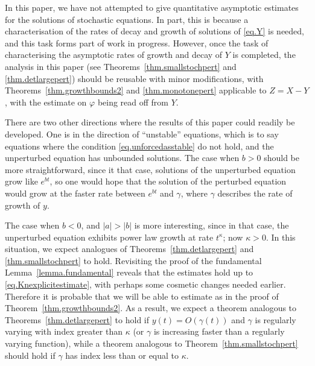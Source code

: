 \documentclass[a4paper,10pt,reqno]{amsart}
\numberwithin{equation}{section}
\theoremstyle{definition}
\theoremstyle{remark}
\DeclareMathOperator{\1}{\mathbbm 1}
\begin{document}
In this paper, we have not attempted to give quantitative asymptotic estimates for the solutions of stochastic equations. In part, this is because a characterisation of the rates of decay and growth of solutions of \eqref{eq.Y} is needed, and this task forms part of work in progress. However, once the task of characterising the asymptotic rates of growth and decay of $Y$ is completed, the analysis in this paper (see Theorems~\ref{thm.smallstochpert} and \ref{thm.detlargepert}) should be reusable with minor modifications, with Theorems~\ref{thm.growthbounds2} and \ref{thm.monotonepert} applicable to $Z=X-Y$, with the estimate on $\varphi$ being read off from $Y$.

There are two other directions where the results of this paper could readily be developed. One is in the direction of ``unstable'' equations, which is to say equations where the condition \eqref{eq.unforcedasstable} do not hold, and the unperturbed equation has unbounded solutions. The case when $b>0$ should be more straightforward, since it that case, solutions of the unperturbed equation grow like $e^{bt}$, so one would hope that the solution of the perturbed equation would grow at the faster rate between $e^{bt}$ and $\gamma$, where $\gamma$ describes the rate of growth of $y$.

The case when $b<0$, and $|a|>|b|$ is more interesting, since in that case, the unperturbed equation exhibits power law growth at rate $t^\kappa$; now $\kappa>0$. In this situation, we expect analogues of Theorems~\ref{thm.detlargepert} and \ref{thm.smallstochpert} to hold. Revisiting the proof of the fundamental Lemma~\ref{lemma.fundamental} reveals that the estimates hold up to \eqref{eq.Knexplicitestimate}, with perhaps some cosmetic changes needed earlier. Therefore it is probable that we will be able to estimate as in the proof of Theorem~\ref{thm.growthbounds2}. As a result, we expect a theorem analogous to Theorems~\ref{thm.detlargepert} to hold if $y(t)=O(\gamma(t))$ and  $\gamma$ is regularly varying with index greater than $\kappa$ (or $\gamma$ is increasing faster than a regularly varying function), while a theorem
analogous to Theorem~\ref{thm.smallstochpert} should hold if $\gamma$ has index less than or equal to $\kappa$. 
\end{document}
